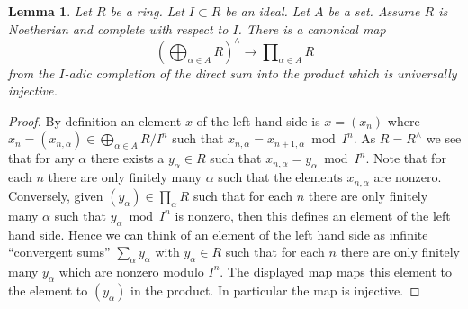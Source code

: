 \documentclass{amsart}
\theoremstyle{plain}
\newtheorem{lemma}[subsection]{Lemma}
\theoremstyle{definition}
\theoremstyle{remark}
\numberwithin{equation}{subsection}
\begin{document}
\begin{lemma}
\label{more-algebra-lemma-ui-completion-direct-sum-into-product}
Let $R$ be a ring.
Let $I \subset R$ be an ideal.
Let $A$ be a set.
Assume $R$ is Noetherian and complete with respect to $I$. There is a
canonical map
$$
\left(\bigoplus\nolimits_{\alpha \in A} R\right)^\wedge
\longrightarrow
\prod\nolimits_{\alpha \in A} R
$$
from the $I$-adic completion of the direct sum into the product
which is universally injective.
\end{lemma}

\begin{proof}
By definition an element $x$ of the left hand side is $x = (x_n)$ where
$x_n = (x_{n, \alpha}) \in \bigoplus\nolimits_{\alpha \in A} R/I^n$
such that $x_{n, \alpha} = x_{n + 1, \alpha} \bmod I^n$.
As $R = R^\wedge$ we see that for any $\alpha$ there exists a $y_\alpha \in R$
such that $x_{n, \alpha} = y_\alpha \bmod I^n$. Note that for each $n$ there
are only finitely many $\alpha$ such that the elements $x_{n, \alpha}$ are
nonzero. Conversely, given $(y_\alpha) \in \prod_\alpha R$ such that for each
$n$ there are only finitely many $\alpha$ such that $y_{\alpha} \bmod I^n$
is nonzero, then this defines an element of the left hand side.
Hence we can think of an element of the left hand side as infinite
``convergent sums'' $\sum_\alpha y_\alpha$ with $y_\alpha \in R$
such that for each $n$ there are only finitely many $y_\alpha$
which are nonzero modulo $I^n$. The displayed map maps this element
to the element to $(y_\alpha)$ in the product.
In particular the map is injective.


\end{proof}
\end{document}
